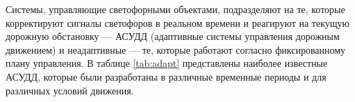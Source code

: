 \documentclass[11pt]{ubs}
\begin{document}
Системы, управляющие светофорными объектами, подразделяют на те, которые корректируют сигналы светофоров в реальном времени и реагируют на текущую дорожную обстановку --- АСУДД (адаптивные системы управления дорожным движением) и неадаптивные --- те, которые работают согласно фиксированному плану управления.
В таблице \ref{tab:adapt} представлены наиболее известные АСУДД, которые были разработаны в различные временные периоды и для различных условий движения.%
\begin{table}[h!]
  \caption{Распространенные модели  АСУДД}
  \label{tab:adapt}
  \centering
\end{table}
\end{document}
